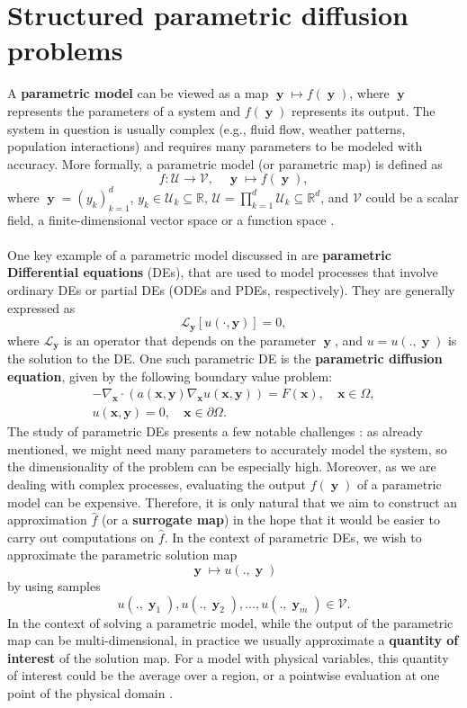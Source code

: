 \documentclass[12pt, oneside]{report}   	%
\newcommand{\R}{\mathbb{R}}
\DeclareMathOperator{\y}{\boldsymbol{y}}
\begin{document}
\section{Structured parametric diffusion problems}
\label{sec:param}


A \textbf{parametric model} can be viewed as a map $\y\mapsto f(\y)$, where $\y$ represents the parameters of a system and $f(\y)$ represents its output. The system in question is usually complex (e.g., fluid flow, weather patterns, population interactions) and requires many parameters to be modeled with accuracy. More formally, a parametric model (or parametric map) is defined as 
$$
f:\mathcal{U}\to\mathcal{V}, \quad \y\mapsto f(\y),
$$
where $\y=(y_k)_{k=1}^d$, $y_k\in\mathcal{U}_k\subseteq\R$, $\mathcal{U}=\prod\limits_{k=1}^d \mathcal{U}_k\subseteq\R^d$, and $\mathcal{V}$ could be a scalar field, a finite-dimensional vector space or a function space \cite{sparsepoly}.\\\\
One key example of a parametric model discussed in \cite[Chapter~4]{sparsepoly} are \textbf{parametric Differential equations} (DEs), that are used to model processes that involve ordinary DEs or partial DEs (ODEs and PDEs, respectively). They are generally expressed as
$$
\mathscr{L}_{\boldsymbol{y}}[u(\cdot, \boldsymbol{y})]=0,
$$
where $\mathscr{L}_{\boldsymbol{y}}$ is an operator that depends on the parameter $\y$, and $u=u(.,\y)$ is the solution to the DE. One such parametric DE is the \textbf{parametric diffusion equation}, given by the following boundary value problem:
\begin{align*}
-\nabla_{\boldsymbol{x}} \cdot\left(a(\boldsymbol{x}, \boldsymbol{y}) \nabla_{\boldsymbol{x}} u(\boldsymbol{x}, \boldsymbol{y})\right)=F(\boldsymbol{x}), \quad \boldsymbol{x} \in \Omega, \\
u(\boldsymbol{x}, \boldsymbol{y})=0, \quad \boldsymbol{x} \in \partial \Omega.
\end{align*}
The study of parametric DEs presents a few notable challenges \cite{sparsepoly}: as already mentioned, we might need many parameters to accurately model the system, so the dimensionality of the problem can be especially high. Moreover, as we are dealing with complex processes, evaluating the output $f(\y)$ of a parametric model can be expensive. Therefore, it is only natural that we aim to construct an approximation $\hat{f}$ (or a \textbf{surrogate map}) in the hope that it would be easier to carry out computations on $\hat{f}$. In the context of parametric DEs, we wish to approximate the parametric solution map
$$
\y\mapsto u(.,\y)
$$
by using samples 
$$
u(.,\y_1), u(.,\y_2), ..., u(.,\y_m) \in\mathcal{V}.
$$
In the context of solving a parametric model, while the output of the parametric map can be multi-dimensional, in practice we usually approximate a \textbf{quantity of interest} of the solution map. For a model with physical variables, this quantity of interest could be the average over a region, or a pointwise evaluation at one point of the physical domain \cite{sparsepoly}.
\end{document}
